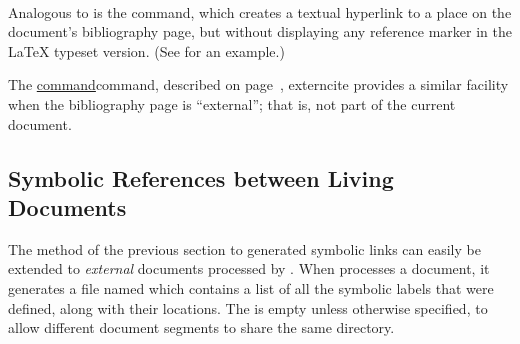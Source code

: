 %
\paragraph*{\label{htmlcite}}
Analogous to  is the  command,
which creates a textual hyperlink to a place on the document's bibliography page, 
but without displaying any reference marker in the \LaTeX{} typeset version.
(See  for an example.)%

The  
\hyperref[page]{command}{command, described on page~}{, }{externcite}
provides a similar facility when the bibliography page is ``external'';
that is, not part of the current document.%




\subsection{Symbolic References between Living Documents\label{external_cross}}%
\tableofchildlinks*
{}
%
%
%
%
%
The method of the previous section to generated
symbolic  links can
easily be extended to \emph{external} documents processed by \latextohtml.  
When \latextohtml{} processes a document, it generates a \Perl{} file 
named 
which contains a list of all the symbolic labels that were defined, 
along with their locations.  
The  is empty unless otherwise specified, 
to allow different document segments to share the same directory.  

%
%
